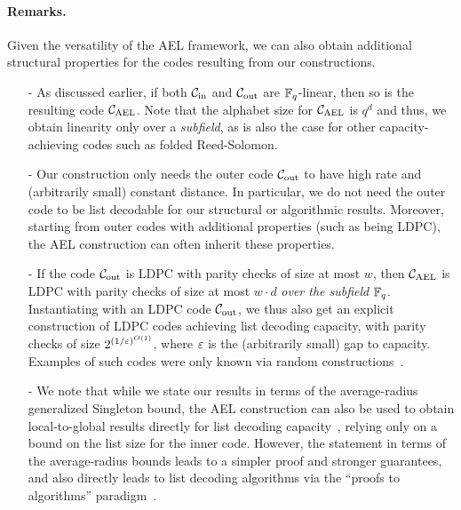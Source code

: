 \paragraph{Remarks.}
%
Given the versatility of the AEL framework, we can also obtain additional structural properties for the codes resulting from our constructions.
%
\begin{itemize}
%
\item[-] As discussed earlier, if both ${\mathcal C}_{\mathrm{in}}$ and ${\mathcal C}_{\mathrm{out}}$ are ${\mathbb F}_q$-linear, then so
  is the resulting code ${ {\mathcal C}_{\mathrm{AEL}} }$. Note that the alphabet size for ${ {\mathcal C}_{\mathrm{AEL}} }$ is $q^d$ and thus, we
  obtain linearity only over a \emph{subfield}, as is also the case for other capacity-achieving
  codes such as folded Reed-Solomon.
%
\item[-] Our construction only needs the outer code ${\mathcal C}_{\mathrm{out}}$ to have high rate and (arbitrarily small) constant distance. In particular, we do not need the outer code to be list decodable for our structural or algorithmic results. Moreover, starting from outer codes with additional properties (such as being LDPC), the AEL construction can often inherit these properties.
%
\item[-] If the code ${\mathcal C}_{\mathrm{out}}$ is LDPC with parity checks of size at most $w$, then ${ {\mathcal C}_{\mathrm{AEL}} }$ is LDPC with parity checks of size at most $w \cdot d$ \emph{over the subfield} ${\mathbb F}_q$. 
%
Instantiating with an LDPC code ${\mathcal C}_{\mathrm{out}}$, we thus also get an explicit construction of LDPC codes achieving list decoding capacity, with parity checks of size $2^{(1/\varepsilon)^{O(1)}}$, where $\varepsilon$ is the (arbitrarily small) gap to capacity. Examples of such codes were only known via random constructions~\cite{MosheiffRRSW19}.
%
\item[-] We note that while we state our results in terms of the average-radius generalized Singleton bound, the AEL construction can also be used to obtain local-to-global results directly for list decoding capacity~\cite{Sri24:thesis}, relying only on a bound on the list size for the inner code.
%
However, the statement in terms of the average-radius bounds leads to a simpler proof and stronger guarantees, and also directly leads to list decoding algorithms via the ``proofs to algorithms''
paradigm~\cite{FKP19}.
%
\end{itemize}
%
\vspace{-10 pt}
